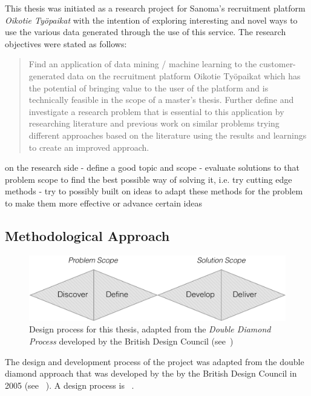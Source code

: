 This thesis was initiated as a research project for Sanoma's recruitment platform \emph{Oikotie Työpaikat} with the intention of exploring interesting and novel ways to use the various data generated through the use of this service. The research objectives were stated as follows:

\blockquote{Find an application of data mining / machine learning to the customer-generated data on the recruitment platform Oikotie Työpaikat which has the potential of bringing value to the user of the platform and is technically feasible in the scope of a master’s thesis. Further define and investigate a research problem that is essential to this application by researching literature and previous work on similar problems trying different approaches based on the literature using the results and learnings to create an improved approach.}

on the research side
- define a good topic and scope
- evaluate solutions to that problem scope to find the best possible way of solving it, i.e. try cutting edge methods
- try to possibly built on ideas to adapt these methods for the problem to make them more effective or advance certain ideas

\subsection{Methodological Approach}
\label{sub:Methodological Approach}

\begin{figure}[h]
    \centering
    \includegraphics[width=\textwidth]{img/double-diamond.pdf}
    \caption{Design process for this thesis, adapted from the \emph{Double Diamond Process} developed by the British Design Council (see~\cite{Council:2007aa})}
\label{fig:double-diamond}
\end{figure}

The design and development process of the project was adapted from the double diamond approach that was developed by the by the British Design Council in 2005 (see ~\cite{Council:2007aa}). A design process is ~\cite{Best:2006aa}.


